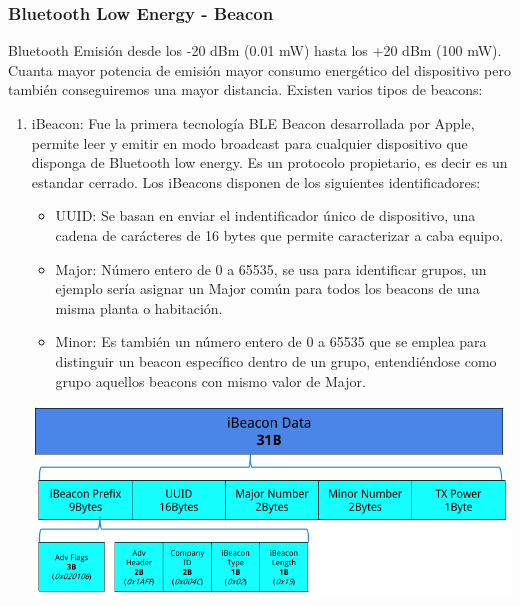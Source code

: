 \documentclass[a4paper ,12pt, onecolumn]{article}
\begin{document}
        \subsubsection {Bluetooth Low Energy - Beacon}
            Bluetooth 
            Emisión desde los -20 dBm (0.01 mW) hasta los +20 dBm (100 mW). Cuanta mayor potencia de emisión mayor consumo energético
            del dispositivo pero también conseguiremos una mayor distancia.
            Existen varios tipos de beacons:
            \begin{enumerate}
                \item iBeacon: Fue la primera tecnología BLE Beacon desarrollada por Apple, permite leer y emitir en modo 
                broadcast para cualquier dispositivo que disponga de Bluetooth low energy. Es un protocolo propietario, es 
                decir es un estandar cerrado. 
                Los iBeacons disponen de los siguientes identificadores:
                \begin{itemize}
                    \item UUID: Se basan en enviar el indentificador único de dispositivo, una cadena de
                    carácteres de 16 bytes que permite caracterizar a caba equipo.
                    \item Major: Número entero de 0 a 65535, se usa para identificar grupos, un ejemplo sería 
                    asignar un Major común para todos los beacons de una misma planta o habitación.
                    \item Minor: Es también un número entero de 0 a 65535 que se emplea para distinguir un beacon
                    específico dentro de un grupo, entendiéndose como grupo aquellos beacons con mismo valor de Major.
                \end{itemize}
                \begin{center}
                    \includegraphics[scale=0.4]{tipos_beacon_ibeacon.PNG}
                \end{center}

\end{enumerate}
\end{document}

